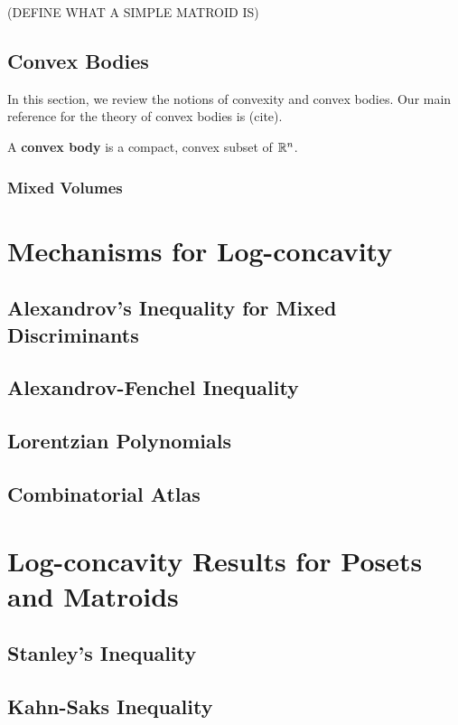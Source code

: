 \documentclass{puthesis-UG}
\begin{document}
(DEFINE WHAT A SIMPLE MATROID IS)

\section{Convex Bodies}

In this section, we review the notions of convexity and convex bodies. Our main reference for the theory of convex bodies is (cite).

\begin{defn}
	A \textbf{convex body} is a compact, convex subset of $\mathbb{R}^n$.
\end{defn}
\subsection{Mixed Volumes}

\chapter{Mechanisms for Log-concavity}

\section{Alexandrov's Inequality for Mixed Discriminants}

\section{Alexandrov-Fenchel Inequality}

\section{Lorentzian Polynomials}

\section{Combinatorial Atlas}

\chapter{Log-concavity Results for Posets and Matroids}

\section{Stanley's Inequality}

\section{Kahn-Saks Inequality}
\end{document}
